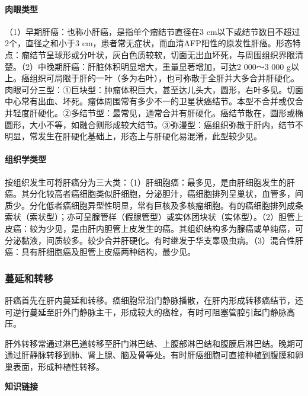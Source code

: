 \paragraph{肉眼类型}
（1）早期肝癌：也称小肝癌，是指单个瘤结节直径在3
cm以下或结节数目不超过2个，直径之和小于3
cm，患者常无症状，而血清AFP阳性的原发性肝癌。形态特点：瘤结节呈球形或分叶状，灰白色质较软，切面无出血坏死，与周围组织界限清楚。（2）中晚期肝癌：肝脏体积明显增大，重量显著增加，可达2
000～3 000
g以上。癌组织可局限于肝的一叶（多为右叶），也可弥散于全肝并大多合并肝硬化。肉眼可分三型：①巨块型：肿瘤体积巨大，甚至达儿头大，圆形，右叶多见。切面中心常有出血、坏死。瘤体周围常有多少不一的卫星状癌结节。本型不合并或仅合并轻度肝硬化。②多结节型：最常见，通常合并有肝硬化。癌结节散在，圆形或椭圆形，大小不等，如融合则形成较大结节。③弥漫型：癌组织弥散于肝内，结节不明显，常发生在肝硬化基础上，形态上与肝硬化易混淆，此型较少见。

\paragraph{组织学类型}
按组织发生可将肝癌分为三大类：（1）肝细胞癌：最多见，是由肝细胞发生的肝癌。其分化较高者癌细胞类似肝细胞，分泌胆汁，癌细胞排列呈巢状，血管多，间质少。分化低者癌细胞异型性明显，常有巨核及多核瘤细胞。有的癌细胞排列成条索状（索状型）；亦可呈腺管样（假腺管型）或实体团块状（实体型）。（2）胆管上皮癌：较为少见，是由肝内胆管上皮发生的癌。其组织结构多为腺癌或单纯癌，可分泌黏液，间质较多。较少合并肝硬化。有时继发于华支睾吸虫病。（3）混合性肝癌：具有肝细胞癌及胆管上皮癌两种结构，最少见。

\subsubsection{蔓延和转移}

肝癌首先在肝内蔓延和转移。癌细胞常沿门静脉播散，在肝内形成转移癌结节，还可逆行蔓延至肝外门静脉主干，形成较大的癌栓，有时可阻塞管腔引起门静脉高压。

肝外转移常通过淋巴道转移至肝门淋巴结、上腹部淋巴结和腹膜后淋巴结。晚期可通过肝静脉转移到肺、肾上腺、脑及骨等处。有时肝癌细胞可直接种植到腹膜和卵巢表面，形成种植性转移。

\begin{center}
    \textbf{知识链接}
\end{center}

